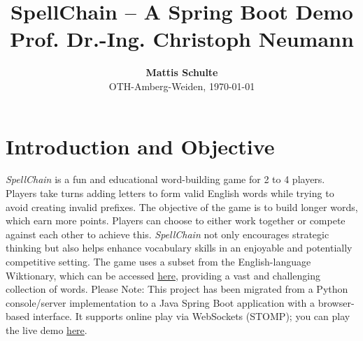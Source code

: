 \documentclass{article}
\begin{document}
\title{\textbf{SpellChain -- A Spring Boot Demo}\\ \vspace{0.2cm}\large \textbf{Prof. Dr.-Ing. Christoph Neumann}}
\author{\normalsize\textbf{Mattis Schulte}\\ {\small OTH-Amberg-Weiden, \today}}\date{}
\maketitle

\section*{Introduction and Objective}
\textit{SpellChain} is a fun and educational word-building game for 2 to 4 players. Players take turns adding letters to form valid English words while trying to avoid creating invalid prefixes. The objective of the game is to build longer words, which earn more points. Players can choose to either work together or compete against each other to achieve this. \textit{SpellChain} not only encourages strategic thinking but also helps enhance vocabulary skills in an enjoyable and potentially competitive setting. The game uses a subset from the English-language Wiktionary, which can be accessed \href{https://en.wiktionary.org/wiki/Wiktionary:Main_Page}{\textcolor{links}{here}}, providing a vast and challenging collection of words. Please Note: This project has been migrated from a Python console/server implementation to a Java Spring Boot application with a browser-based interface. It supports online play via WebSockets (STOMP); you can play the live demo \href{https://spellchain.mattisschulte.io/}{\textcolor{links}{here}}.
\end{document}
